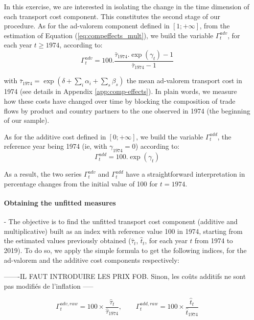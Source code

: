 \documentclass[a4paper,11pt]{article}
\begin{document}
In this exercise, we are interested in isolating the change in the time dimension of each transport cost component.
This constitutes the second stage of our procedure.
As for the ad-valorem component defined in $[1;+\infty]$, from the estimation of Equation (\ref{eq:compeffects_mult}), we build the variable $\Gamma^{adv}_t$, for each year $t\geq 1974$, according to:
\begin{equation}
\Gamma^{adv}_t = 100.\frac {\bar{\tau}_{1974}.\exp(\gamma_t)-1} {\bar{\tau}_{1974}-1} \label{eq:comp_effects_adv}
\end{equation}

\noindent with $\bar{\tau}_{1974} = \exp(\delta +\sum_i \alpha_i +\sum_s \beta_s)$ the mean ad-valorem transport cost in 1974 (see details in Appendix \ref{app:comp-effects}).
In plain words, we measure how these costs have changed over time by blocking the composition of trade flows by product and country partners to the one observed in 1974 (the beginning of our sample).

As for the additive cost defined in $[0;+\infty]$, we build the variable $\Gamma^{add}_t$, the reference year being 1974 (ie, with $\gamma_{1974}=0$) according to:
\begin{equation}
\Gamma^{add}_t = 100.\exp(\gamma_t) \label{eq:comp_effects_add}
\end{equation}

\noindent As a result, the two series $\Gamma^{adv}_t$ and $\Gamma^{add}_t$ have a straightforward interpretation in percentage changes from the initial value of 100 for $t=1974$.


\paragraph{Obtaining the unfitted measures} - The objective is to find the unfitted transport cost component (additive and multiplicative) built as an index with reference value 100 in 1974, starting from the estimated values previously obtained ($\widehat{\tau}_t$, $\widehat{t}_t$, for each year $t$ from 1974 to 2019).
To do so, we apply the simple formula to get the following indices, for the ad-valorem and the additive cost components respectively:

-------IL FAUT INTRODUIRE LES PRIX FOB. Sinon, les coûts additifs ne sont pas modifiés de l’inflation -----

$$\Gamma^{adv, raw}_t = 100\times\frac{\widehat{\tau}_t}{\widehat{\tau}_{1974}},\qquad \Gamma^{add, raw}_t = 100\times\frac{\widehat{t}_t}{\widehat{t}_{1974}}$$
\end{document}
